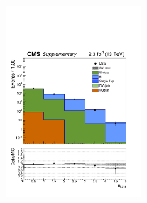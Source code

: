 \begin{figure}[tbhp]
\begin{center}
     \includegraphics[width=0.45\textwidth]{SingleMu_nBJet40_all_all_aux} \\
  \end{center}
\end{figure}



